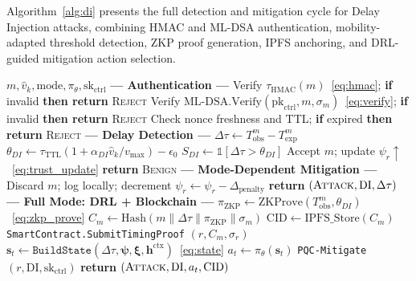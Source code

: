 Algorithm~\ref{alg:di} presents the full detection and
mitigation cycle for Delay Injection attacks, combining
HMAC and ML-DSA authentication, mobility-adapted threshold
detection, ZKP proof generation, IPFS anchoring, and
DRL-guided mitigation action selection.

\begin{algorithm}[H]
\caption{Delay Injection Detection and Mitigation
(\texttt{DI-Defend})}
\label{alg:di}
\begin{algorithmic}[1]
\small
{}
  {$m,\hat{v}_k,\mathrm{mode},\pi_\theta,\mathrm{sk}_{\mathrm{ctrl}}$}
  \State \textbf{--- Authentication ---}
  \State Verify $\tau_{\mathrm{HMAC}}(m)$~\eqref{eq:hmac};
    \textbf{if} invalid \textbf{then return} \textsc{Reject}
  \State Verify $\mathrm{ML\text{-}DSA.Verify}
    (\mathrm{pk}_{\mathrm{ctrl}},m,\sigma_m)$~\eqref{eq:verify};
    \textbf{if} invalid \textbf{then return} \textsc{Reject}
  \State Check nonce freshness and TTL;
    \textbf{if} expired \textbf{then return} \textsc{Reject}
  \State \textbf{--- Delay Detection ---}
  \State $\Delta\tau \gets T_{\mathrm{obs}}^m - T_{\mathrm{exp}}^m$
  \State $\theta_{DI} \gets \tau_{\mathrm{TTL}}
    (1+\alpha_{DI}\hat{v}_k/v_{\max})-\epsilon_0$
  \State $S_{DI} \gets \mathbb{1}[\Delta\tau > \theta_{DI}]$
    \State Accept $m$; update $\psi_r \uparrow$~\eqref{eq:trust_update}
    \State \textbf{return} \textsc{Benign}
  \EndIf
  \State \textbf{--- Mode-Dependent Mitigation ---}
    \State Discard $m$; log locally;
      decrement $\psi_r \gets \psi_r - \Delta_{\mathrm{penalty}}$
    \State \textbf{return} $(\textsc{Attack},\mathrm{DI},\Delta\tau)$
  \EndIf
  \State \textbf{--- Full Mode: DRL + Blockchain ---}
  \State $\pi_{\mathrm{ZKP}} \gets \mathrm{ZKProve}
    (T_{\mathrm{obs}}^m, \theta_{DI})$~\eqref{eq:zkp_prove}
  \State $C_m \gets \mathrm{Hash}
    (m\|\Delta\tau\|\pi_{\mathrm{ZKP}}\|\sigma_m)$
  \State $\mathrm{CID} \gets \mathrm{IPFS\_Store}(C_m)$
  \State \texttt{SmartContract.SubmitTimingProof}
    $(r,C_m,\sigma_r)$
  \State $\mathbf{s}_t \gets \texttt{BuildState}
    (\Delta\tau,\boldsymbol{\psi},\boldsymbol{\xi},
    \mathbf{h}^{\mathrm{ctx}})$~\eqref{eq:state}
  \State $a_t \gets \pi_\theta(\mathbf{s}_t)$
    \State \texttt{PQC-Mitigate}$(r,\mathrm{DI},
      \mathrm{sk}_{\mathrm{ctrl}})$
  \EndIf
  \State \textbf{return} $(\textsc{Attack},\mathrm{DI},
    a_t,\mathrm{CID})$
\EndProcedure
\end{algorithmic}
\end{algorithm}

